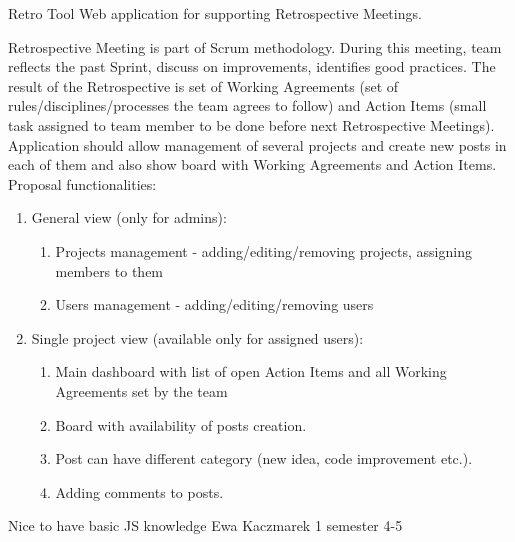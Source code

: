 \begin{project}
{Retro Tool}
{Web application for supporting Retrospective Meetings.}
{
Retrospective Meeting is part of Scrum methodology. During this meeting, team reflects the past Sprint, discuss on improvements, identifies good practices. The result of the Retrospective is set of Working Agreements (set of rules/disciplines/processes the team agrees to follow) and Action Items (small task assigned to team member to be done before next Retrospective Meetings).
\bigbreak
Application should allow management of several projects and create new posts in each of them and also show board with Working Agreements and Action Items.
\bigbreak
Proposal functionalities:
\begin{enumerate}
	\item General view (only for admins):
		\begin{enumerate}
			\item Projects management - adding/editing/removing projects, assigning members to them
			\item Users management - adding/editing/removing users
		\end{enumerate}
	\item Single project view (available only for assigned users):
		\begin{enumerate}
			\item Main dashboard with list of open Action Items and all Working Agreements set by the team
			\item Board with availability of posts creation.
			\item Post can have different category (new idea, code improvement etc.).
			\item Adding comments to posts.
		\end{enumerate}
\end{enumerate}
}
{Nice to have basic JS knowledge}
{Ewa Kaczmarek}
{1 semester}
{4-5}
\end{project}
